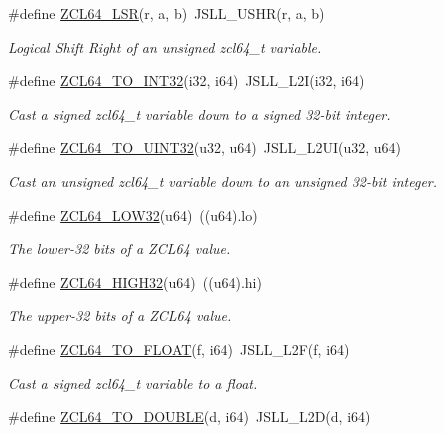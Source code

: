 \begin{DoxyCompactItemize}
\#define \hyperlink{group__zcl__64_ga389dd5298bd8f8574f55aa6a687f41a8}{Z\-C\-L64\-\_\-\-L\-S\-R}(r, a, b)~J\-S\-L\-L\-\_\-\-U\-S\-H\-R(r, a, b)
\begin{DoxyCompactList}\small\item\em Logical Shift Right of an unsigned zcl64\-\_\-t variable. \end{DoxyCompactList}\item 
\#define \hyperlink{group__zcl__64_gaceb8fdf41f4dc532f6028bab90521d3e}{Z\-C\-L64\-\_\-\-T\-O\-\_\-\-I\-N\-T32}(i32, i64)~J\-S\-L\-L\-\_\-\-L2\-I(i32, i64)
\begin{DoxyCompactList}\small\item\em Cast a signed zcl64\-\_\-t variable down to a signed 32-\/bit integer. \end{DoxyCompactList}\item 
\#define \hyperlink{group__zcl__64_ga628915c271405b5eaeb673089f0df6ba}{Z\-C\-L64\-\_\-\-T\-O\-\_\-\-U\-I\-N\-T32}(u32, u64)~J\-S\-L\-L\-\_\-\-L2\-U\-I(u32, u64)
\begin{DoxyCompactList}\small\item\em Cast an unsigned zcl64\-\_\-t variable down to an unsigned 32-\/bit integer. \end{DoxyCompactList}\item 
\#define \hyperlink{group__zcl__64_gafa2d05dfa497827d3f232698f5f47c2b}{Z\-C\-L64\-\_\-\-L\-O\-W32}(u64)~((u64).lo)
\begin{DoxyCompactList}\small\item\em The lower-\/32 bits of a Z\-C\-L64 value. \end{DoxyCompactList}\item 
\#define \hyperlink{group__zcl__64_ga6a24898481f0fe419858c8b51cafda3e}{Z\-C\-L64\-\_\-\-H\-I\-G\-H32}(u64)~((u64).hi)
\begin{DoxyCompactList}\small\item\em The upper-\/32 bits of a Z\-C\-L64 value. \end{DoxyCompactList}\item 
\#define \hyperlink{group__zcl__64_ga3f09d28af6abe1a4a5c427ea93686ea1}{Z\-C\-L64\-\_\-\-T\-O\-\_\-\-F\-L\-O\-A\-T}(f, i64)~J\-S\-L\-L\-\_\-\-L2\-F(f, i64)
\begin{DoxyCompactList}\small\item\em Cast a signed zcl64\-\_\-t variable to a {\ttfamily float}. \end{DoxyCompactList}\item 
\#define \hyperlink{group__zcl__64_ga3cca4ebbc7fafb30919421d7cd0a2d73}{Z\-C\-L64\-\_\-\-T\-O\-\_\-\-D\-O\-U\-B\-L\-E}(d, i64)~J\-S\-L\-L\-\_\-\-L2\-D(d, i64)

\end{DoxyCompactItemize}
